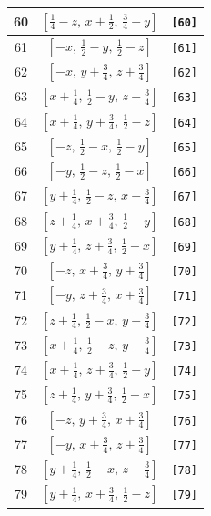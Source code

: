 \documentclass[fleqn,8pt]{jsarticle}
\begin{document}
\begin{longtable}{ccc}
60 & $\left[ \frac{1}{4} - z,\, x + \frac{1}{2},\, \frac{3}{4} - y \right]$ & {\tt [60]} \\ \hline
61 & $\left[ - x,\, \frac{1}{2} - y,\, \frac{1}{2} - z \right]$ & {\tt [61]} \\ \hline
62 & $\left[ - x,\, y + \frac{3}{4},\, z + \frac{3}{4} \right]$ & {\tt [62]} \\ \hline
63 & $\left[ x + \frac{1}{4},\, \frac{1}{2} - y,\, z + \frac{3}{4} \right]$ & {\tt [63]} \\ \hline
64 & $\left[ x + \frac{1}{4},\, y + \frac{3}{4},\, \frac{1}{2} - z \right]$ & {\tt [64]} \\ \hline
65 & $\left[ - z,\, \frac{1}{2} - x,\, \frac{1}{2} - y \right]$ & {\tt [65]} \\ \hline
66 & $\left[ - y,\, \frac{1}{2} - z,\, \frac{1}{2} - x \right]$ & {\tt [66]} \\ \hline
67 & $\left[ y + \frac{1}{4},\, \frac{1}{2} - z,\, x + \frac{3}{4} \right]$ & {\tt [67]} \\ \hline
68 & $\left[ z + \frac{1}{4},\, x + \frac{3}{4},\, \frac{1}{2} - y \right]$ & {\tt [68]} \\ \hline
69 & $\left[ y + \frac{1}{4},\, z + \frac{3}{4},\, \frac{1}{2} - x \right]$ & {\tt [69]} \\ \hline
70 & $\left[ - z,\, x + \frac{3}{4},\, y + \frac{3}{4} \right]$ & {\tt [70]} \\ \hline
71 & $\left[ - y,\, z + \frac{3}{4},\, x + \frac{3}{4} \right]$ & {\tt [71]} \\ \hline
72 & $\left[ z + \frac{1}{4},\, \frac{1}{2} - x,\, y + \frac{3}{4} \right]$ & {\tt [72]} \\ \hline
73 & $\left[ x + \frac{1}{4},\, \frac{1}{2} - z,\, y + \frac{3}{4} \right]$ & {\tt [73]} \\ \hline
74 & $\left[ x + \frac{1}{4},\, z + \frac{3}{4},\, \frac{1}{2} - y \right]$ & {\tt [74]} \\ \hline
75 & $\left[ z + \frac{1}{4},\, y + \frac{3}{4},\, \frac{1}{2} - x \right]$ & {\tt [75]} \\ \hline
76 & $\left[ - z,\, y + \frac{3}{4},\, x + \frac{3}{4} \right]$ & {\tt [76]} \\ \hline
77 & $\left[ - y,\, x + \frac{3}{4},\, z + \frac{3}{4} \right]$ & {\tt [77]} \\ \hline
78 & $\left[ y + \frac{1}{4},\, \frac{1}{2} - x,\, z + \frac{3}{4} \right]$ & {\tt [78]} \\ \hline
79 & $\left[ y + \frac{1}{4},\, x + \frac{3}{4},\, \frac{1}{2} - z \right]$ & {\tt [79]} \\ \hline

\end{longtable}
\end{document}
